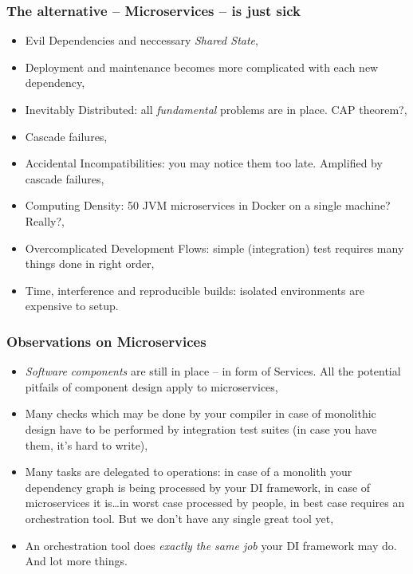 \documentclass[usenames,dvipsnames]{beamer}
\begin{document}
\begin{frame}
\frametitle{The alternative -- Microservices -- is just sick}

\begin{itemize}
\item Evil Dependencies and neccessary \textit{Shared State},
\item Deployment and maintenance becomes more complicated with each new dependency,
\item Inevitably Distributed: all \textit{fundamental} problems are in place. CAP theorem?,
\item Cascade failures,
\item Accidental Incompatibilities: you may notice them too late. Amplified by cascade failures,
\item Computing Density: 50 JVM microservices in Docker on a single machine? Really?,
\item Overcomplicated Development Flows: simple (integration\footnotemark[1]) test requires many things done in right order,
\item Time, interference and reproducible builds: isolated environments are expensive to setup.
\end{itemize}
\end{frame}

\begin{frame}
\frametitle{Observations on Microservices}
\begin{itemize}
\item \textit{Software components} are still in place -- in form of Services.
      All the potential pitfails of component design apply to microservices,
\item Many checks which may be done by your compiler in case of monolithic design have  
     to be performed by integration test suites (in case you have them, it's hard to write),   
\item Many tasks are delegated to operations: in case of a monolith your dependency graph is being 
      processed by your DI framework, in case of microservices it is\dots in worst case processed by people,
      in best case requires an orchestration tool. But we don't have any single great tool yet,
\item An orchestration tool does \textit{exactly the same job} your DI framework may do. And lot more things.
\end{itemize}
\end{frame}
\end{document}
